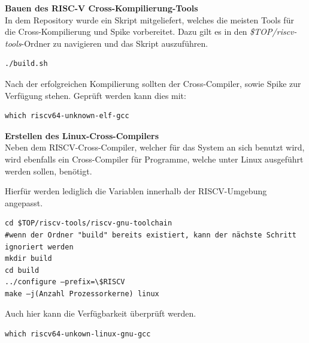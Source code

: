 \textbf{Bauen des RISC-V Cross-Kompilierung-Tools}\\

In dem Repository wurde ein Skript mitgeliefert, welches die meisten Tools für die Cross-Kompilierung und Spike vorbereitet.
Dazu gilt es in den \emph{\$TOP/riscv-tools}-Ordner zu navigieren und das Skript
auszuführen.\\

\begin{lstlisting}[caption={Ausführen des \emph{build}-Skripts},label={code:buildskript}]
./build.sh
\end{lstlisting}



Nach der erfolgreichen Kompilierung sollten der Cross-Compiler, sowie Spike zur Verfügung stehen. Geprüft werden kann dies mit:\\

\begin{lstlisting}[caption={Überprüfung der Erreichbarkeit des Compilers},label={code:elfgcc}]
which riscv64-unknown-elf-gcc
\end{lstlisting}


\vspace{5mm}
\textbf{Erstellen des Linux-Cross-Compilers}\\

Neben dem RISCV-Cross-Compiler, welcher für das System an sich benutzt wird, wird ebenfalls ein Cross-Compiler für Programme, welche unter Linux ausgeführt werden sollen, benötigt.

Hierfür werden lediglich die Variablen innerhalb der RISCV-Umgebung angepasst.\\

\begin{lstlisting}[caption={Anpassung der RISCV-Umgebung},label={code:riscvumgebung},extendedchars=false]
cd $TOP/riscv-tools/riscv-gnu-toolchain
#wenn der Ordner "build" bereits existiert, kann der nächste Schritt ignoriert werden
mkdir build
cd build
../configure –prefix=\$RISCV
make –j(Anzahl Prozessorkerne) linux
\end{lstlisting}

\newpage
Auch hier kann die Verfügbarkeit überprüft werden.\\

\begin{lstlisting}[caption={Überprüfung der Erreichbarkeit des Linux-Compilers},label={code:linuxgcc}]
which riscv64-unkown-linux-gnu-gcc
\end{lstlisting}


